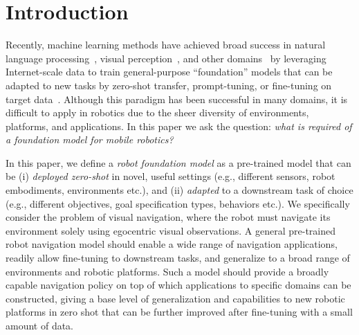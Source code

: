 \documentclass{article}
\newcommand{\basement}{foundation\xspace}
\begin{document}
\section{Introduction}
\label{sec:introduction}




Recently, machine learning methods have achieved broad success in natural language processing~\cite{Radford2018ImprovingLU}, visual perception~\cite{deng2009imagenet, carreira2017kinetics, grauman2022ego4d}, and other domains~\cite{ramesh2022dalle2, chen2021codex} by leveraging Internet-scale data to train general-purpose ``foundation'' models that can be adapted to new tasks by zero-shot transfer, prompt-tuning, or fine-tuning on target data~\cite{chen2020simple, shah2022robotic, liu2021power, lester2021power}. Although this paradigm has been successful in many domains, it is difficult to apply in robotics due to the sheer diversity of environments, platforms, and applications. In this paper we ask the question: \emph{what is required of a \basement model for mobile robotics?}

In this paper, we define a \emph{robot foundation model} as a pre-trained model that can be (i) \emph{deployed zero-shot} in novel, useful settings (e.g., different sensors, robot embodiments, environments etc.), and (ii) \emph{adapted} to a downstream task of choice (e.g., different objectives, goal specification types, behaviors etc.).
We specifically consider the problem of visual navigation, where the robot must navigate its environment solely using egocentric visual observations. A general pre-trained robot navigation model should enable a wide range of navigation applications, readily allow fine-tuning to downstream tasks, and generalize to a broad range of environments and robotic platforms. Such a model should provide a broadly capable navigation policy on top of which applications to specific domains can be constructed, giving a base level of generalization and capabilities to new robotic platforms in zero shot that can be further improved after fine-tuning with a small amount of data. %
\end{document}
